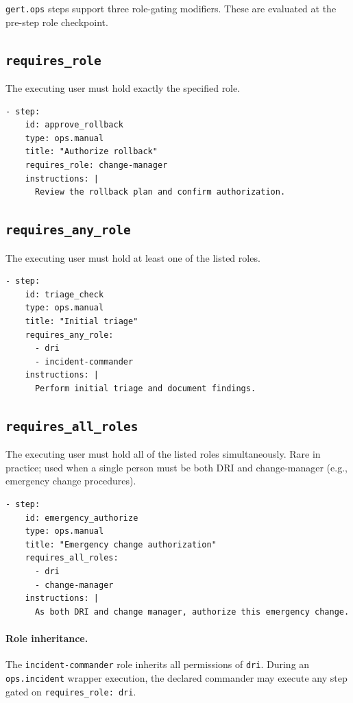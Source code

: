 \texttt{gert.ops} steps support three role-gating modifiers. These are evaluated at the
pre-step role checkpoint.

\subsection{\texttt{requires\_role}}

The executing user must hold exactly the specified role.

\begin{verbatim}
- step:
    id: approve_rollback
    type: ops.manual
    title: "Authorize rollback"
    requires_role: change-manager
    instructions: |
      Review the rollback plan and confirm authorization.
\end{verbatim}

\subsection{\texttt{requires\_any\_role}}

The executing user must hold at least one of the listed roles.

\begin{verbatim}
- step:
    id: triage_check
    type: ops.manual
    title: "Initial triage"
    requires_any_role:
      - dri
      - incident-commander
    instructions: |
      Perform initial triage and document findings.
\end{verbatim}

\subsection{\texttt{requires\_all\_roles}}

The executing user must hold all of the listed roles simultaneously. Rare in practice; used
when a single person must be both DRI and change-manager (e.g., emergency change procedures).

\begin{verbatim}
- step:
    id: emergency_authorize
    type: ops.manual
    title: "Emergency change authorization"
    requires_all_roles:
      - dri
      - change-manager
    instructions: |
      As both DRI and change manager, authorize this emergency change.
\end{verbatim}

\paragraph{Role inheritance.} The \texttt{incident-commander} role inherits all permissions of
\texttt{dri}. During an \texttt{ops.incident} wrapper execution, the declared commander may
execute any step gated on \texttt{requires\_role: dri}.

